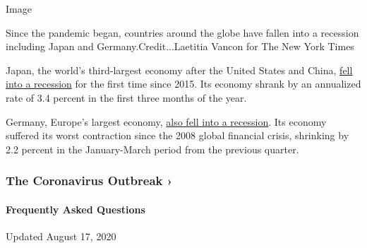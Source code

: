 Image

Since the pandemic began, countries around the globe have fallen into a
recession including Japan and Germany.Credit...Laetitia Vancon for The
New York Times

Japan, the world's third-largest economy after the United States and
China,
\href{https://www.nytimes3xbfgragh.onion/2020/05/17/business/japan-recession-coronavirus.html?action=click\&module=RelatedLinks\&pgtype=Article}{fell
into a recession} for the first time since 2015. Its economy shrank by
an annualized rate of 3.4 percent in the first three months of the year.

Germany, Europe's largest economy,
\href{https://www.nytimes3xbfgragh.onion/2020/05/15/business/stock-market-today-coronavirus.html?module=STYLN_live_tabs\&variant=1_menu\&region=header\&context=menu\&state=default\&pgtype=Article}{also
fell into a recession}. Its economy suffered its worst contraction since
the 2008 global financial crisis, shrinking by 2.2 percent in the
January-March period from the previous quarter.

\href{https://www.nytimes3xbfgragh.onion/news-event/coronavirus?action=click\&pgtype=Article\&state=default\&region=MAIN_CONTENT_3\&context=storylines_faq}{}

\hypertarget{the-coronavirus-outbreak-}{%
\subsubsection{The Coronavirus Outbreak
›}\label{the-coronavirus-outbreak-}}

\hypertarget{frequently-asked-questions}{%
\paragraph{Frequently Asked
Questions}\label{frequently-asked-questions}}

Updated August 17, 2020

